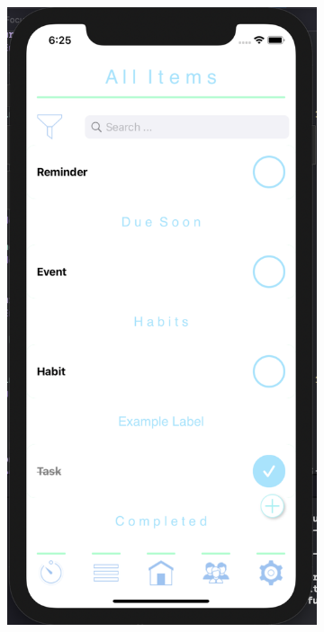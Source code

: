 \begin{figure}[H]
    \centering
    \begin{subfigure}[b]{0.3\textwidth}
        \centering
        \includegraphics[width=\textwidth]{./graphics/Implementation/All Items/all items1.png}

\end{subfigure}
\end{figure}
